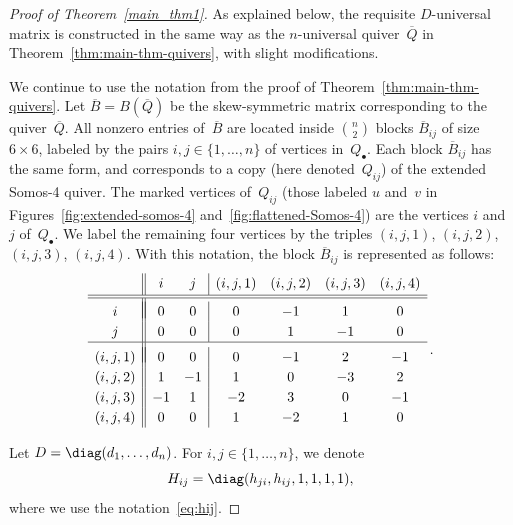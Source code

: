 \begin{proof}[Proof of Theorem~\ref{main_thm1}]
As explained below, the requisite $D$-universal matrix is constructed in the same way as the $n$-universal quiver~$\overline Q$ in Theorem~\ref{thm:main-thm-quivers}, with slight modifications. 

We continue to use the notation from the proof of Theorem~\ref{thm:main-thm-quivers}. 
Let $\overline B=B(\overline Q)$ be the skew-symmetric matrix corresponding to the quiver~$\overline Q$. All nonzero entries of~$\overline B$ are located inside $\binom{n}{2}$ blocks $\overline B_{ij}$ of size $6\times 6$, labeled by the pairs $i,j\in\{1,\dots,n\}$ of vertices in~$Q_\bullet$. Each block $\overline B_{ij}$ has the same form, and corresponds to a copy (here denoted~$Q_{ij}$) of the extended Somos-4 quiver. The marked vertices of~$Q_{ij}$ (those labeled $u$ and~$v$ in Figures~\ref{fig:extended-somos-4} and~\ref{fig:flattened-Somos-4}) are the vertices $i$ and~$j$ of~$Q_\bullet$. We label the remaining four vertices by the triples $(i,j,1)$, $(i,j,2)$, $(i,j,3)$, $(i,j,4)$. With this notation, the block $\overline B_{ij}$ is represented as follows:
\begin{equation}
\label{eq:overline-Bij}
\renewcommand{\arraystretch}{1.2}
\begin{array}{c||cc|cccc}
& i & j & (i,j,1) & (i,j,2) & (i,j,3) & (i,j,4) \\[1pt]
\hline
\hline
\\[-12pt]
i & 0 & 0 & 0 & -1 & 1 & 0 \\
j & 0 & 0 & 0 & 1 & -1 & 0 \\
\hline
\\[-11pt]
(i,j,1) & 0 & 0 & 0 & -1 & 2 & -1 \\
(i,j,2) & 1 & -1 & 1 & 0 & -3 & 2 \\
(i,j,3) & -1 &1 &-2 & 3 & 0 & -1 \\
(i,j,4) & 0 & 0 & 1 & -2 & 1 &0 
\end{array}\,.
\end{equation}

Let $D=\diag (d_1,\dots,d_n)$. For $i,j\in\{1,\dots,n\}$, we denote
\[
H_{ij}=\diag (h_{ji},h_{ij},1,1,1,1), 
\]
where we use the notation~\eqref{eq:hij}. 


\end{proof}

